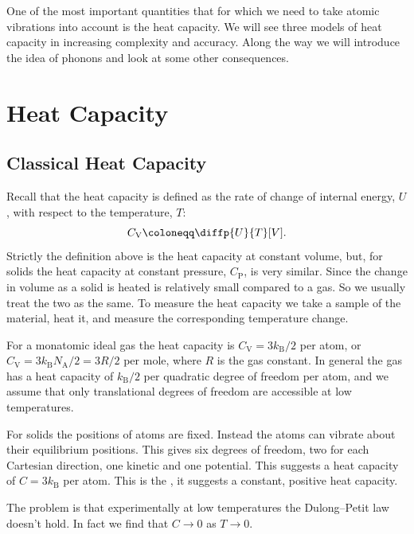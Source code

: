 \documentclass[fleqn]{NotesClass}
\newcommand*{\boltzmann}{k_{\mathrm{B}}}
\newcommand*{\avogadro}{N_{\mathrm{A}}}
\newcommand*{\heatCapacityVolume}{C_{\mathrm{V}}}
\newcommand*{\heatCapacityPressure}{C_{\mathrm{P}}}
\begin{document}
    One of the most important quantities that for which we need to take atomic vibrations into account is the heat capacity.
    We will see three models of heat capacity in increasing complexity and accuracy.
    Along the way we will introduce the idea of phonons and look at some other consequences.
    
    \section{Heat Capacity}
    \subsection{Classical Heat Capacity}
    Recall that the heat capacity is defined as the rate of change of internal energy, \(U\), with respect to the temperature, \(T\):
    \begin{equation}
        \heatCapacityVolume \coloneqq \diffp{U}{T}[V].
    \end{equation}
    Strictly the definition above is the heat capacity at constant volume, but, for solids the heat capacity at constant pressure, \(\heatCapacityPressure\), is very similar.
    Since the change in volume as a solid is heated is relatively small compared to a gas.
    So we usually treat the two as the same.
    To measure the heat capacity we take a sample of the material, heat it, and measure the corresponding temperature change.
    
    For a monatomic ideal gas the heat capacity is \(\heatCapacityVolume = 3\boltzmann/2\) per atom, or \(\heatCapacityVolume = 3\boltzmann\avogadro/2 = 3R/2\) per mole, where \(R\) is the gas constant.
    In general the gas has a heat capacity of \(\boltzmann/2\) per quadratic degree of freedom per atom, and we assume that only translational degrees of freedom are accessible at low temperatures.
    
    For solids the positions of atoms are fixed.
    Instead the atoms can vibrate about their equilibrium positions.
    This gives six degrees of freedom, two for each Cartesian direction, one kinetic and one potential.
    This suggests a heat capacity of \(C = 3\boltzmann\) per atom.
    This is the , it suggests a constant, positive heat capacity.
    
    The problem is that experimentally at low temperatures the Dulong--Petit law doesn't hold.
    In fact we find that \(C \to 0\) as \(T \to 0\).
    
\end{document}
